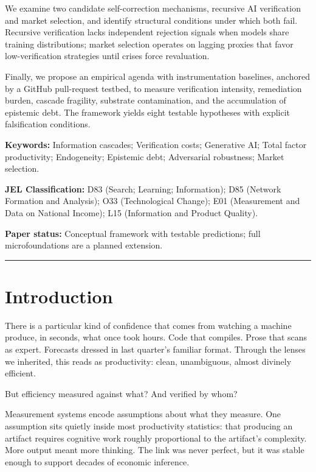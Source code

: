 \documentclass[11pt,a4paper]{article}
\begin{document}
We examine two candidate self-correction mechanisms, recursive AI verification and market selection, and identify structural conditions under which both fail. Recursive verification lacks independent rejection signals when models share training distributions; market selection operates on lagging proxies that favor low-verification strategies until crises force revaluation.

Finally, we propose an empirical agenda with instrumentation baselines, anchored by a GitHub pull-request testbed, to measure verification intensity, remediation burden, cascade fragility, substrate contamination, and the accumulation of epistemic debt. The framework yields eight testable hypotheses with explicit falsification conditions.

\textbf{Keywords:} Information cascades; Verification costs; Generative AI; Total factor productivity; Endogeneity; Epistemic debt; Adversarial robustness; Market selection.

\textbf{JEL Classification:} D83 (Search; Learning; Information); D85 (Network Formation and Analysis); O33 (Technological Change); E01 (Measurement and Data on National Income); L15 (Information and Product Quality).

\textbf{Paper status:} Conceptual framework with testable predictions; full microfoundations are a planned extension.

\begin{center}\rule{0.5\linewidth}{0.5pt}\end{center}

\hypertarget{introduction}{%
\section{Introduction}\label{introduction}}

There is a particular kind of confidence that comes from watching a machine produce, in seconds, what once took hours. Code that compiles. Prose that scans as expert. Forecasts dressed in last quarter's familiar format. Through the lenses we inherited, this reads as productivity: clean, unambiguous, almost divinely efficient.

But efficiency measured against what? And verified by whom?

Measurement systems encode assumptions about what they measure. One assumption sits quietly inside most productivity statistics: that producing an artifact requires cognitive work roughly proportional to the artifact's complexity. More output meant more thinking. The link was never perfect, but it was stable enough to support decades of economic inference.
\end{document}
